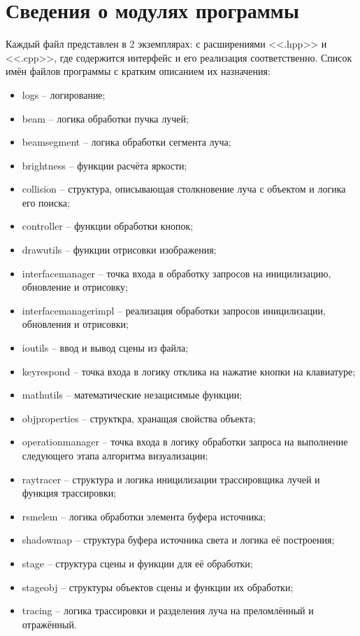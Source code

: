 \section{Сведения о модулях программы} {
        Каждый файл представлен в 2 экземплярах:
        с расширениями <<.hpp>> и <<.cpp>>, где содержится
        интерфейс и его реализация соответственно.
        Список имён файлов программы с кратким описанием их назначения:
        \begin{itemize}
            \item logs -- логирование;
            \item beam -- логика обработки пучка лучей;
            \item beamsegment -- логика обработки сегмента луча;
            \item brightness -- функции расчёта яркости;
            \item collision -- структура, описывающая столкновение
            луча с объектом и логика его поиска;
            \item controller -- функции обработки кнопок;
            \item drawutils -- функции отрисовки изображения;
            \item interfacemanager -- точка входа в обработку запросов
            на иницилизацию, обновление и отрисовку;
            \item interfacemanagerimpl -- реализация обработки запросов
            иницилизации, обновления и отрисовки;
            \item ioutils -- ввод и вывод сцены из файла;
            \item keyrespond -- точка входа в логику отклика
            на нажатие кнопки на клавиатуре;
            \item mathutils -- математические незацисимые функции;
            \item objproperties -- структкра, хранащая свойства объекта;
            \item operationmanager -- точка входа в логику обработки запроса
            на выполнение следующего этапа алгоритма визуализации;
            \item raytracer -- структура и логика иницилизации трассировщика лучей и функция трассировки;
            \item rsmelem -- логика обработки элемента буфера источника;
            \item shadowmap -- структура буфера источника света
            и логика её построения;
            \item stage -- структура сцены и функции для её обработки;
            \item stageobj -- структуры объектов сцены и функции их
            обработки;
            \item tracing -- логика трассировки и разделения луча
            на преломлённый и отражённый.
        \end{itemize}
        
}
